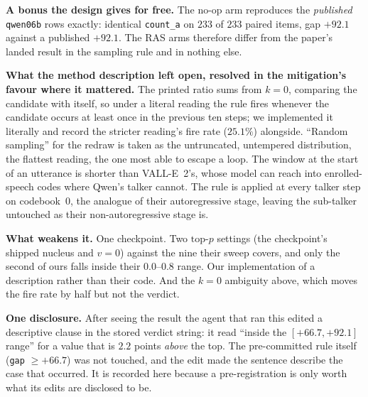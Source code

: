 \documentclass[11pt]{article}
\begin{document}
\textbf{A bonus the design gives for free.} The no-op arm reproduces the
\emph{published} \texttt{qwen06b} rows exactly: identical \texttt{count\_a} on
$233$ of $233$ paired items, gap $+92.1$ against a published $+92.1$. The RAS
arms therefore differ from the paper's landed result in the sampling rule and in
nothing else.

\textbf{What the method description left open, resolved in the mitigation's
favour where it mattered.} The printed ratio sums from $k{=}0$, comparing the
candidate with itself, so under a literal reading the rule fires whenever the
candidate occurs at least once in the previous ten steps; we implemented it
literally and record the stricter reading's fire rate ($25.1\%$) alongside.
``Random sampling'' for the redraw is taken as the untruncated, untempered
distribution, the flattest reading, the one most able to escape a loop. The
window at the start of an utterance is shorter than VALL-E~2's, whose model can
reach into enrolled-speech codes where Qwen's talker cannot. The rule is applied
at every talker step on codebook~0, the analogue of their autoregressive stage,
leaving the sub-talker untouched as their non-autoregressive stage is.

\textbf{What weakens it.} One checkpoint. Two $\text{top-}p$ settings (the
checkpoint's shipped nucleus and $v{=}0$) against the nine their sweep covers,
and only the second of ours falls inside their $0.0$--$0.8$ range. Our implementation of a description rather than their code.
And the $k{=}0$ ambiguity above, which moves the fire rate by half but not the
verdict.

\textbf{One disclosure.} After seeing the result the agent that ran this edited a
descriptive clause in the stored verdict string: it read ``inside the
$[+66.7, +92.1]$ range'' for a value that is $2.2$ points \emph{above} the top.
The pre-committed rule itself (\texttt{gap} $\ge +66.7$) was not touched, and the
edit made the sentence describe the case that occurred. It is recorded here
because a pre-registration is only worth what its edits are disclosed to be.



\end{document}
